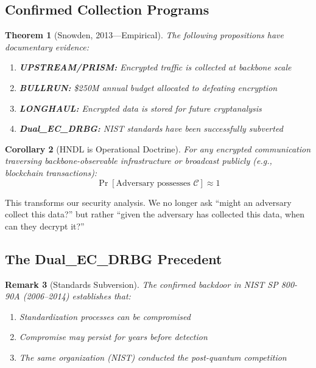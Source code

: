 \documentclass[11pt,a4paper]{article}
\newtheorem{theorem}{Theorem}[section]
\newtheorem{corollary}[theorem]{Corollary}
\newtheorem{remark}[theorem]{Remark}
\begin{document}
\subsection{Confirmed Collection Programs}

\begin{theorem}[Snowden, 2013---Empirical]
The following propositions have documentary evidence:
\begin{enumerate}[noitemsep]
    \item \textbf{UPSTREAM/PRISM:} Encrypted traffic is collected at backbone scale
    \item \textbf{BULLRUN:} \$250M annual budget allocated to defeating encryption
    \item \textbf{LONGHAUL:} Encrypted data is stored for future cryptanalysis
    \item \textbf{Dual\_EC\_DRBG:} NIST standards have been successfully subverted
\end{enumerate}
\end{theorem}

\begin{corollary}[HNDL is Operational Doctrine]
For any encrypted communication traversing backbone-observable infrastructure or broadcast publicly (e.g., blockchain transactions):
\begin{equation}
\Pr[\text{Adversary possesses } \mathcal{C}] \approx 1
\end{equation}
\end{corollary}

This transforms our security analysis. We no longer ask ``might an adversary collect this data?'' but rather ``given the adversary has collected this data, when can they decrypt it?''

\subsection{The Dual\_EC\_DRBG Precedent}

\begin{remark}[Standards Subversion]
The confirmed backdoor in NIST SP 800-90A (2006--2014) establishes that:
\begin{enumerate}[noitemsep]
    \item Standardization processes can be compromised
    \item Compromise may persist for years before detection
    \item The same organization (NIST) conducted the post-quantum competition
\end{enumerate}
\end{remark}
\end{document}
